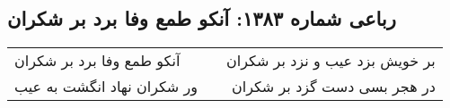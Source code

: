 \begin{center}
\section*{رباعی شماره ۱۳۸۳: آنکو طمع وفا برد بر شکران}
\label{sec:1383}
\begin{longtable}{l p{0.5cm} r}
آنکو طمع وفا برد بر شکران
&&
بر خویش بزد عیب و نزد بر شکران
\\
ور شکران نهاد انگشت به عیب
&&
در هجر بسی دست گزد بر شکران
\\
\end{longtable}
\end{center}
